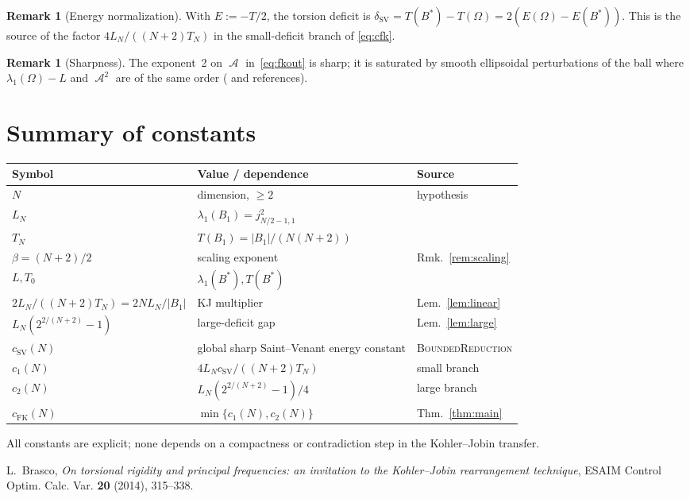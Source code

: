 \documentclass[11pt]{article}
\theoremstyle{definition}
\newtheorem{remark}[theorem]{Remark}
\DeclareMathOperator{\Asym}{\mathcal{A}}
\begin{document}
\begin{remark}[Energy normalization]
With $E:=-T/2$, the torsion deficit is
$\delta_{\mathrm{SV}}=T(B^*)-T(\Omega)=2(E(\Omega)-E(B^*))$. This is the
source of the factor $4L_N/((N+2)T_N)$ in the small-deficit branch of
\eqref{eq:cfk}.
\end{remark}

\begin{remark}[Sharpness]
The exponent~2 on $\Asym$ in~\eqref{eq:fkout} is sharp; it is saturated by
smooth ellipsoidal perturbations of the ball where
$\lambda_1(\Omega)-L$ and $\Asym^2$ are of the same order
(\cite{Brasco2014} and references).
\end{remark}

\section{Summary of constants}\label{sec:const}

\begin{center}
\renewcommand{\arraystretch}{1.25}
\begin{tabular}{|l|l|l|}
\hline
Symbol & Value / dependence & Source \\
\hline
$N$ & dimension, $\ge2$ & hypothesis \\
$L_N$ & $\lambda_1(B_1)=j_{N/2-1,1}^2$ & \\
$T_N$ & $T(B_1)=|B_1|/(N(N+2))$ & \\
$\beta=(N+2)/2$ & scaling exponent & Rmk.~\ref{rem:scaling} \\
$L,T_0$ & $\lambda_1(B^*),T(B^*)$ & \\
$2L_N/((N+2)T_N)=2NL_N/|B_1|$ & KJ multiplier & Lem.~\ref{lem:linear} \\
$L_N(2^{2/(N+2)}-1)$ & large-deficit gap & Lem.~\ref{lem:large} \\
$c_{\mathrm{SV}}(N)$ & global sharp Saint--Venant energy constant & \textsc{BoundedReduction} \\
$c_1(N)$ & $4L_N c_{\mathrm{SV}}/((N+2)T_N)$ & small branch \\
$c_2(N)$ & $L_N(2^{2/(N+2)}-1)/4$ & large branch \\
$c_{\mathrm{FK}}(N)$ & $\min\{c_1(N),c_2(N)\}$ & Thm.~\ref{thm:main} \\
\hline
\end{tabular}
\end{center}

All constants are explicit; none depends on a compactness or contradiction
step in the Kohler--Jobin transfer.

\begin{thebibliography}{9}
 L.~Brasco,
\emph{On torsional rigidity and principal frequencies: an invitation to
the Kohler--Jobin rearrangement technique},
ESAIM Control Optim. Calc. Var. \textbf{20} (2014), 315--338.
\end{thebibliography}
\end{document}
